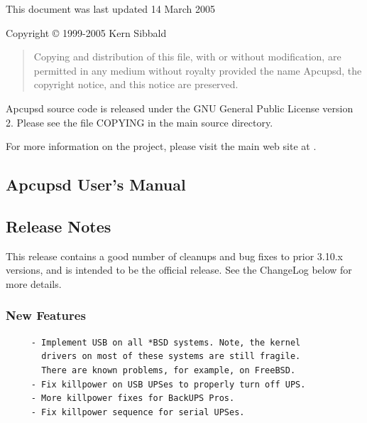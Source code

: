 This document was last updated 14 March 2005  

Copyright {\copyright} 1999-2005 Kern Sibbald  

\begin{quote}
Copying and distribution of this file, with or without modification, are
permitted in any medium without royalty provided the name Apcupsd, the
copyright notice, and this notice are preserved. 
\end{quote}

Apcupsd source code is released under the GNU General Public License version
2. Please see the file COPYING in the main source directory.  

For more information on the project, please visit the main web site at 
. 

\label{Top}

\subsection*{Apcupsd User's Manual}

\label{Release-Notes}

\subsection*{Release Notes}

\label{index-Release-Notes-1}
This release contains a good number of cleanups and bug fixes to prior 3.10.x
versions, and is intended to be the official release. See the ChangeLog below
for more details. 

\label{New-Features}

\subsubsection*{New Features}

\label{index-New-Features-2}

\footnotesize
\begin{verbatim}
     - Implement USB on all *BSD systems. Note, the kernel
       drivers on most of these systems are still fragile.
       There are known problems, for example, on FreeBSD.
     - Fix killpower on USB UPSes to properly turn off UPS.
     - More killpower fixes for BackUPS Pros.
     - Fix killpower sequence for serial UPSes.
\end{verbatim}
\normalsize

